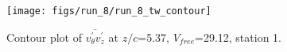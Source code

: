 \begin{figure}[H]
\centering
\texttt{[image: figs/run\_8/run\_8\_tw\_contour]}
\caption{Contour plot of $\overline{v_{\theta}^{\prime} v_{z}^{\prime}}$ at $z/c$=5.37, $V_{free}$=29.12, station 1.}
\label{fig:run_8_tw_contour}
\end{figure}


